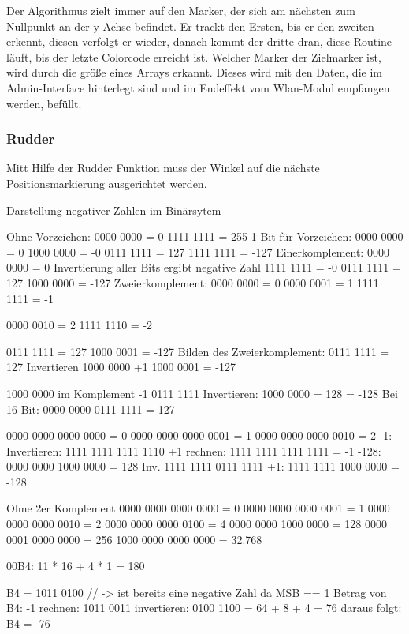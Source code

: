     Der Algorithmus zielt immer auf den Marker, der sich am nächsten zum Nullpunkt an der y-Achse befindet. Er trackt den Ersten, bis er den zweiten erkennt, diesen verfolgt er wieder, danach kommt der dritte dran, diese Routine läuft, bis der letzte Colorcode erreicht ist. Welcher Marker der Zielmarker ist, wird durch die größe eines Arrays erkannt. Dieses wird mit den Daten, die im Admin-Interface hinterlegt sind und im Endeffekt vom Wlan-Modul empfangen werden, befüllt.

    \subsubsection{Rudder}

    Mitt Hilfe der Rudder Funktion muss der Winkel auf die nächste Positionsmarkierung ausgerichtet werden.


    Darstellung negativer Zahlen im Binärsytem

Ohne Vorzeichen:
0000 0000 = 0
1111 1111 = 255
1 Bit für Vorzeichen:
    0000 0000 = 0
    1000 0000 = -0
    0111 1111 = 127
    1111 1111 = -127
Einerkomplement:
    0000 0000 = 0
    Invertierung aller Bits ergibt negative Zahl
    1111 1111 = -0
    0111 1111 = 127
    1000 0000 = -127
Zweierkomplement:
    0000 0000 = 0
    0000 0001 = 1
    1111 1111 = -1

    0000 0010 = 2
    1111 1110 = -2

    0111 1111 = 127
    1000 0001 = -127
Bilden des Zweierkomplement:
    0111 1111 = 127
Invertieren
    1000 0000
+1
    1000 0001 = -127

    1000 0000 im Komplement
           -1
    0111 1111 Invertieren:
    1000 0000 = 128 = -128
Bei 16 Bit:
    0000 0000 0111 1111 = 127

0000 0000 0000 0000 = 0
0000 0000 0000 0001 = 1
0000 0000 0000 0010 = 2
-1:
Invertieren: 1111 1111 1111 1110
+1 rechnen:  1111 1111 1111 1111 = -1
-128:
0000 0000 1000 0000 = 128
Inv. 1111 1111 0111 1111
+1:  1111 1111 1000 0000 = -128

Ohne 2er Komplement {
0000 0000 0000 0000 = 0
0000 0000 0000 0001 = 1
0000 0000 0000 0010 = 2
0000 0000 0000 0100 = 4
0000 0000 1000 0000 = 128
0000 0001 0000 0000 = 256
1000 0000 0000 0000 = 32.768}


00B4: 11 * 16 + 4 * 1 = 180

B4 = 1011 0100 // -> ist bereits eine negative Zahl da MSB == 1
Betrag von B4:
    -1 rechnen:  1011 0011
    invertieren: 0100 1100 = 64 + 8 + 4 = 76
daraus folgt: B4 = -76



